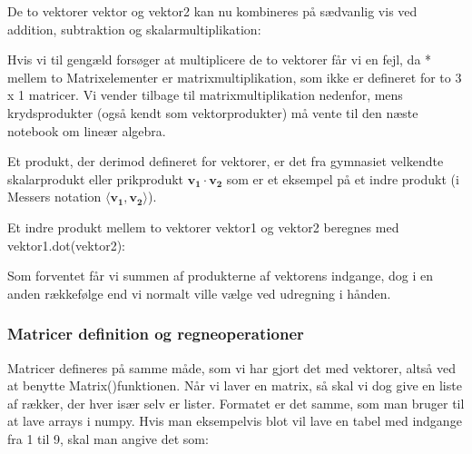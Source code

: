 \documentclass[letterpaper,10pt,english]{jupyterBook}
\begin{document}
De to vektorer vektor og vektor2 kan nu kombineres på sædvanlig vis ved addition, subtraktion og skalarmultiplikation:

\begin{sphinxVerbatim}[commandchars=\\\{\}]
     
\end{sphinxVerbatim}

\noindent{}

\begin{sphinxVerbatim}[commandchars=\\\{\}]
         
\end{sphinxVerbatim}

\noindent{}

Hvis vi til gengæld forsøger at multiplicere de to vektorer får vi en fejl, da * mellem to Matrix\sphinxhyphen{}elementer er matrix\sphinxhyphen{}multiplikation, som ikke er defineret for to 3 x 1 matricer. Vi vender tilbage til matrixmultiplikation nedenfor, mens krydsprodukter (også kendt som vektor\sphinxhyphen{}produkter) må vente til den næste notebook om lineær algebra.

Et produkt, der derimod  defineret for vektorer, er det fra gymnasiet velkendte skalarprodukt eller prikprodukt \(\mathbf{v_1} \cdot \mathbf{v_2}\) som er et eksempel på et indre produkt (i Messers notation \(\langle \mathbf{v_1}, \mathbf{v_2}\rangle\)).

Et indre produkt mellem to vektorer vektor1 og vektor2 beregnes med vektor1.dot(vektor2):

\begin{sphinxVerbatim}[commandchars=\\\{\}]
\end{sphinxVerbatim}

\noindent{}

Som forventet får vi summen af produkterne af vektorens indgange, dog i en anden rækkefølge end vi normalt ville vælge ved udregning i hånden.


\subsubsection{Matricer \sphinxhyphen{} definition og regneoperationer}
\label{\detokenize{notebooks/sympy/Notebook_LinAlg1:matricer-definition-og-regneoperationer}}
Matricer defineres på samme måde, som vi har gjort det med vektorer, altså ved at benytte Matrix()\sphinxhyphen{}funktionen. Når vi laver en matrix, så skal vi dog give en liste af rækker, der hver især selv er lister. Formatet er det samme, som man bruger til at lave arrays i numpy. Hvis man eksempelvis blot vil lave en tabel med indgange fra 1 til 9, skal man angive det som:
\end{document}
